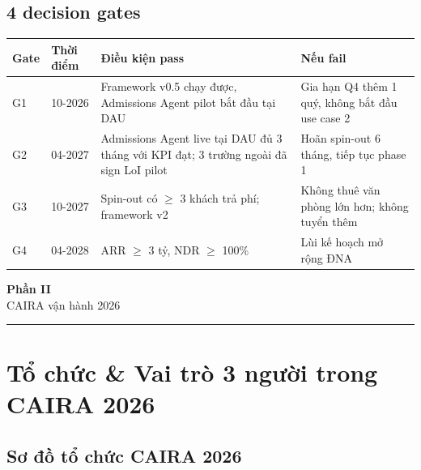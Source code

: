 \documentclass[11pt,a4paper]{article}
\begin{document}
\subsection{4 decision gates}

\begin{tabularx}{\linewidth}{@{}p{1.2cm} p{2.5cm} X X@{}}
\toprule
\textbf{Gate} & \textbf{Thời điểm} & \textbf{Điều kiện pass} & \textbf{Nếu fail} \\
\midrule
G1 & 10-2026 & Framework v0.5 chạy được, Admissions Agent pilot bắt đầu tại DAU & Gia hạn Q4 thêm 1 quý, không bắt đầu use case 2 \\
G2 & 04-2027 & Admissions Agent live tại DAU đủ 3 tháng với KPI đạt; 3 trường ngoài đã sign LoI pilot & Hoãn spin-out 6 tháng, tiếp tục phase 1 \\
G3 & 10-2027 & Spin-out có $\geq$ 3 khách trả phí; framework v2 & Không thuê văn phòng lớn hơn; không tuyển thêm \\
G4 & 04-2028 & ARR $\geq$ 3 tỷ, NDR $\geq$ 100\% & Lùi kế hoạch mở rộng ĐNA \\
\bottomrule
\end{tabularx}

\clearpage

\begin{center}
\vspace*{0.5em}
{\sffamily\bfseries\Huge\color{caira} Phần II}\\[0.5em]
{\sffamily\LARGE\color{mid} CAIRA vận hành 2026}\\[0.5em]
{\color{caira}\rule{6cm}{0.4pt}}
\end{center}
\vspace{1em}

\section{Tổ chức \& Vai trò 3 người trong CAIRA 2026}

\subsection{Sơ đồ tổ chức CAIRA 2026}
\end{document}
